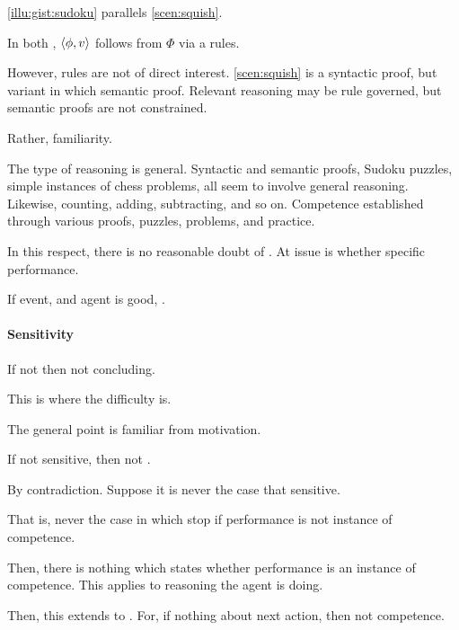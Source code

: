 \begin{note}
  \autoref{illu:gist:sudoku} parallels \autoref{scen:squish}.

  In both , \(\langle \phi, v \rangle\) follows from \(\Phi\) via a rules.

  However, rules are not of direct interest.
  \autoref{scen:squish} is a syntactic proof, but variant  in which semantic proof.
  Relevant reasoning may be rule governed, but semantic proofs are not constrained.

  Rather, familiarity.

  The type of reasoning is general.
  Syntactic and semantic proofs, Sudoku puzzles, simple instances of chess problems, all seem to involve general reasoning.
  Likewise, counting, adding, subtracting, and so on.
  Competence established through various proofs, puzzles, problems, and practice.

  In this respect, there is no reasonable doubt of \sR{}.
  At issue is whether specific performance.
\end{note}

\begin{note}
  \begin{idea}
    If event, and agent is good, \fc{}.
  \end{idea}
\end{note}

\paragraph{Sensitivity}

\begin{note}
  If not \fc{} then not concluding.
\end{note}

\begin{note}
  This is where the difficulty is.

  The general point is familiar from motivation.

  \begin{idea}
    If not sensitive, then not \sR{}.
  \end{idea}
\end{note}

\begin{note}
  By contradiction.
  Suppose it is never the case that sensitive.

  That is, never the case in which stop if performance is not instance of competence.

  Then, there is nothing which states whether performance is an instance of competence.
  This applies to reasoning the agent is doing.

  Then, this extends to .
  For, if nothing about next action, then not competence.
\end{note}

